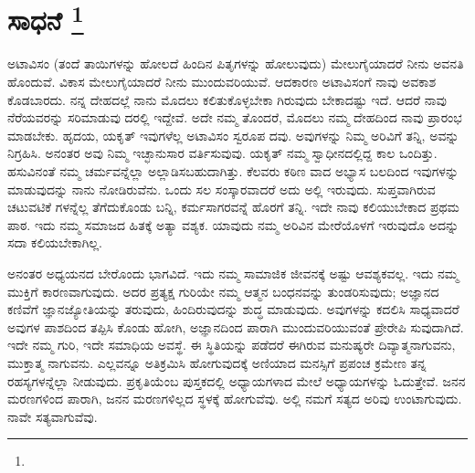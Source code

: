 
\chapter[ಸಾಧನೆ ]{ಸಾಧನೆ \protect\footnote{}}

ಅಟಾವಿಸಂ (ತಂದೆ ತಾಯಿಗಳನ್ನು ಹೋಲದೆ ಹಿಂದಿನ ಪಿತೃಗಳನ್ನು ಹೋಲುವುದು) ಮೇಲುಗೈಯಾದರೆ ನೀನು ಅವನತಿ ಹೊಂದುವೆ. ವಿಕಾಸ ಮೇಲುಗೈಯಾದರೆ ನೀನು ಮುಂದುವರಿಯುವೆ. ಆದಕಾರಣ ಅಟಾವಿಸಂಗೆ ನಾವು ಅವಕಾಶ ಕೊಡಬಾರದು. ನನ್ನ ದೇಹದಲ್ಲೆ ನಾನು ಮೊದಲು ಕಲಿತುಕೊಳ್ಳಬೇಕಾ ಗಿರುವುದು ಬೇಕಾದಷ್ಟು ಇದೆ. ಆದರೆ ನಾವು ನೆರೆಯವರನ್ನು ಸರಿಮಾಡುವು ದರಲ್ಲಿ ಇದ್ದೇವೆ. ಅದೇ ನಮ್ಮ ತೊಂದರೆ, ಮೊದಲು ನಮ್ಮ ದೇಹದಿಂದ ನಾವು ಪ್ರಾರಂಭ ಮಾಡಬೇಕು. ಹೃದಯ, ಯಕೃತ್​ ಇವುಗಳೆಲ್ಲ ಅಟಾವಿಸಂ ಸ್ವರೂಪ ದವು. ಅವುಗಳನ್ನು ನಿಮ್ಮ ಅರಿವಿಗೆ ತನ್ನಿ, ಅವನ್ನು ನಿಗ್ರಹಿಸಿ. ಅನಂತರ ಅವು ನಿಮ್ಮ ಇಚ್ಛಾನುಸಾರ ವರ್ತಿಸುವುವು. ಯಕೃತ್​ ನಮ್ಮ ಸ್ವಾಧೀನದಲ್ಲಿದ್ದ ಕಾಲ ಒಂದಿತ್ತು. ಹಸುವಿನಂತೆ ನಮ್ಮ ಚರ್ಮವನ್ನೆಲ್ಲಾ ಅಲ್ಲಾಡಿಸಬಹುದಾಗಿತ್ತು. ಕೆಲವರು ಕಠಿಣ ವಾದ ಅಭ್ಯಾಸ ಬಲದಿಂದ ಇವುಗಳನ್ನು ಮಾಡುವುದನ್ನು ನಾನು ನೋಡಿರುವೆನು. ಒಂದು ಸಲ ಸಂಸ್ಕಾರವಾದರೆ ಅದು ಅಲ್ಲಿ ಇರುವುದು. ಸುಪ್ತವಾಗಿರುವ ಚಟುವಟಿಕೆ ಗಳನ್ನೆಲ್ಲ ತೆಗೆದುಕೊಂಡು ಬನ್ನಿ, ಕರ್ಮಸಾಗರವನ್ನೆ ಹೊರಗೆ ತನ್ನಿ. ಇದೇ ನಾವು ಕಲಿಯುಬೇಕಾದ ಪ್ರಥಮ ಪಾಠ. ಇದು ನಮ್ಮ ಸಮಾಜದ ಹಿತಕ್ಕೆ ಅತ್ಯಾ ವಶ್ಯಕ. ಯಾವುದು ನಮ್ಮ ಅರಿವಿನ ಮೇರೆಯೊಳಗೆ ಇರುವುದೊ ಅದನ್ನು ಸದಾ ಕಲಿಯಬೇಕಾಗಿಲ್ಲ.

ಅನಂತರ ಅಧ್ಯಯನದ ಬೇರೊಂದು ಭಾಗವಿದೆ. ಇದು ನಮ್ಮ ಸಾಮಾಜಿಕ ಜೀವನಕ್ಕೆ ಅಷ್ಟು ಆವಶ್ಯಕವಲ್ಲ. ಇದು ನಮ್ಮ ಮುಕ್ತಿಗೆ ಕಾರಣವಾಗುವುದು. ಅದರ ಪ್ರತ್ಯಕ್ಷ ಗುರಿಯೇ ನಮ್ಮ ಆತ್ಮನ ಬಂಧನವನ್ನು ತುಂಡರಿಸುವುದು; ಅಜ್ಞಾನದ ಕಣಿವೆಗೆ ಜ್ಞಾನಜ್ಯೋತಿಯನ್ನು ತರುವುದು, ಹಿಂದಿರುವುದನ್ನು ಶುದ್ಧ ಮಾಡುವುದು. ಅವುಗಳನ್ನು ಕದಲಿಸಿ ಸಾಧ್ಯವಾದರೆ ಅವುಗಳ ಪಾಶದಿಂದ ತಪ್ಪಿಸಿ ಕೊಂಡು ಹೋಗಿ, ಅಜ್ಞಾನದಿಂದ ಪಾರಾಗಿ ಮುಂದುವರಿಯುವಂತೆ ಪ್ರೇರೇಪಿ ಸುವುದಾಗಿದೆ. ಇದೇ ನಮ್ಮ ಗುರಿ, ಇದೇ ಸಮಾಧಿಯ ಅವಸ್ಥೆ. ಈ ಸ್ಥಿತಿಯನ್ನು ಪಡೆದರೆ ಈಗಿರುವ ಮನುಷ್ಯರೇ ದಿವ್ಯಾತ್ಮನಾಗುವನು, ಮುಕ್ತಾತ್ಮ ನಾಗುವನು. ಎಲ್ಲವನ್ನೂ ಅತಿಕ್ರಮಿಸಿ ಹೋಗುವುದಕ್ಕೆ ಅಣಿಯಾದ ಮನಸ್ಸಿಗೆ ಪ್ರಪಂಚ ಕ್ರಮೇಣ ತನ್ನ ರಹಸ್ಯಗಳನ್ನೆಲ್ಲಾ ನೀಡುವುದು. ಪ್ರಕೃತಿಯೆಂಬ ಪುಸ್ತಕದಲ್ಲಿ ಅಧ್ಯಾಯಗಳಾದ ಮೇಲೆ ಅಧ್ಯಾಯಗಳನ್ನು ಓದುತ್ತೇವೆ. ಜನನ ಮರಣಗಳಿಂದ ಪಾರಾಗಿ, ಜನನ ಮರಣಗಳಿಲ್ಲದ ಸ್ಥಳಕ್ಕೆ ಹೋಗುವೆವು. ಅಲ್ಲಿ ನಮಗೆ ಸತ್ಯದ ಅರಿವು ಉಂಟಾಗುವುದು. ನಾವೇ ಸತ್ಯವಾಗುವೆವು.

